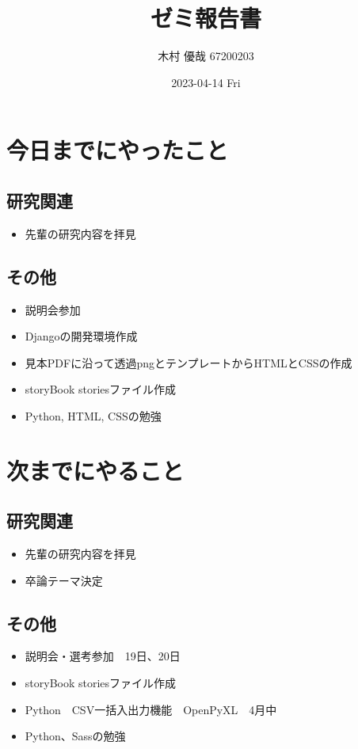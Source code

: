\documentclass[uplatex, onecolumn, 10pt]{jsarticle}
\begin{document}
\title{\vspace{-40mm}\bf{\LARGE{ゼミ報告書}}}
\author{\vspace{-40mm}木村 優哉 67200203}
\date{2023-04-14 Fri}
\maketitle


\section{今日までにやったこと}

\subsection*{研究関連}
\begin{itemize}
	\item 先輩の研究内容を拝見
\end{itemize}

\subsection*{その他}
\begin{itemize}
	\item 説明会参加
	\item Djangoの開発環境作成
	\item 見本PDFに沿って透過pngとテンプレートからHTMLとCSSの作成
	\item storyBook storiesファイル作成
	\item Python, HTML, CSSの勉強
\end{itemize}


\section{次までにやること}

\subsection*{研究関連}
\begin{itemize}
	\item 先輩の研究内容を拝見
	\item 卒論テーマ決定
\end{itemize}

\subsection*{その他}
\begin{itemize}
	\item 説明会・選考参加　19日、20日
	\item storyBook storiesファイル作成
	\item Python　CSV一括入出力機能　OpenPyXL　4月中
	\item Python、Sassの勉強
\end{itemize}
\end{document}

